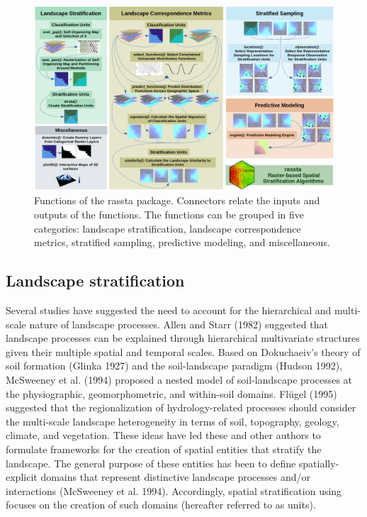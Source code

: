 \begin{figure}[H]

{\centering \includegraphics[width=1\linewidth,height=0.35\textheight]{figures/figure_1} 

}

\caption{Functions of the rassta package. Connectors relate the inputs and outputs of the functions. The functions can be grouped in five categories: landscape stratification, landscape correspondence metrics, stratified sampling, predictive modeling, and miscellaneous.}\label{fig:f1}
\end{figure}

\hypertarget{landscape-stratification}{%
\subsection{Landscape stratification}\label{landscape-stratification}}

Several studies have suggested the need to account for the hierarchical and
multi-scale nature of landscape processes. Allen and Starr (1982) suggested that landscape
processes can be explained through hierarchical multivariate structures given
their multiple spatial and temporal scales. Based on Dokuchaeiv's theory of soil
formation (Glinka 1927) and the soil-landscape paradigm (Hudson 1992),
McSweeney et al. (1994) proposed a nested model of soil-landscape processes at the
physiographic, geomorphometric, and within-soil domains. Flügel (1995) suggested
that the regionalization of hydrology-related processes should consider the
multi-scale landscape heterogeneity in terms of soil, topography, geology,
climate, and vegetation. These ideas have led these and other authors to
formulate frameworks for the creation of spatial entities that stratify the
landscape. The general purpose of these entities has been to define
spatially-explicit domains that represent distinctive landscape processes and/or
interactions (McSweeney et al. 1994). Accordingly, spatial stratification using
 focuses on the creation of such domains (hereafter referred to as
units).

